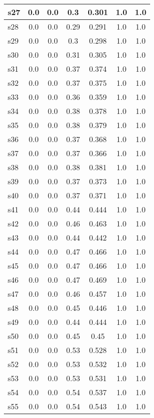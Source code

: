 \documentclass{article}
\begin{document}
\begin{tabular}{|l|c|c|c|c|c|c|}
\hline
s27 &0.0 & 0.0 & 0.3 & 0.301 & 1.0 & 1.0\\
\hline
s28 &0.0 & 0.0 & 0.29 & 0.291 & 1.0 & 1.0\\
\hline
s29 &0.0 & 0.0 & 0.3 & 0.298 & 1.0 & 1.0\\
\hline
s30 &0.0 & 0.0 & 0.31 & 0.305 & 1.0 & 1.0\\
\hline
s31 &0.0 & 0.0 & 0.37 & 0.374 & 1.0 & 1.0\\
\hline
s32 &0.0 & 0.0 & 0.37 & 0.375 & 1.0 & 1.0\\
\hline
s33 &0.0 & 0.0 & 0.36 & 0.359 & 1.0 & 1.0\\
\hline
s34 &0.0 & 0.0 & 0.38 & 0.378 & 1.0 & 1.0\\
\hline
s35 &0.0 & 0.0 & 0.38 & 0.379 & 1.0 & 1.0\\
\hline
s36 &0.0 & 0.0 & 0.37 & 0.368 & 1.0 & 1.0\\
\hline
s37 &0.0 & 0.0 & 0.37 & 0.366 & 1.0 & 1.0\\
\hline
s38 &0.0 & 0.0 & 0.38 & 0.381 & 1.0 & 1.0\\
\hline
s39 &0.0 & 0.0 & 0.37 & 0.373 & 1.0 & 1.0\\
\hline
s40 &0.0 & 0.0 & 0.37 & 0.371 & 1.0 & 1.0\\
\hline
s41 &0.0 & 0.0 & 0.44 & 0.444 & 1.0 & 1.0\\
\hline
s42 &0.0 & 0.0 & 0.46 & 0.463 & 1.0 & 1.0\\
\hline
s43 &0.0 & 0.0 & 0.44 & 0.442 & 1.0 & 1.0\\
\hline
s44 &0.0 & 0.0 & 0.47 & 0.466 & 1.0 & 1.0\\
\hline
s45 &0.0 & 0.0 & 0.47 & 0.466 & 1.0 & 1.0\\
\hline
s46 &0.0 & 0.0 & 0.47 & 0.469 & 1.0 & 1.0\\
\hline
s47 &0.0 & 0.0 & 0.46 & 0.457 & 1.0 & 1.0\\
\hline
s48 &0.0 & 0.0 & 0.45 & 0.446 & 1.0 & 1.0\\
\hline
s49 &0.0 & 0.0 & 0.44 & 0.444 & 1.0 & 1.0\\
\hline
s50 &0.0 & 0.0 & 0.45 & 0.45 & 1.0 & 1.0\\
\hline
s51 &0.0 & 0.0 & 0.53 & 0.528 & 1.0 & 1.0\\
\hline
s52 &0.0 & 0.0 & 0.53 & 0.532 & 1.0 & 1.0\\
\hline
s53 &0.0 & 0.0 & 0.53 & 0.531 & 1.0 & 1.0\\
\hline
s54 &0.0 & 0.0 & 0.54 & 0.537 & 1.0 & 1.0\\
\hline
s55 &0.0 & 0.0 & 0.54 & 0.543 & 1.0 & 1.0\\

\end{tabular}
\end{document}
